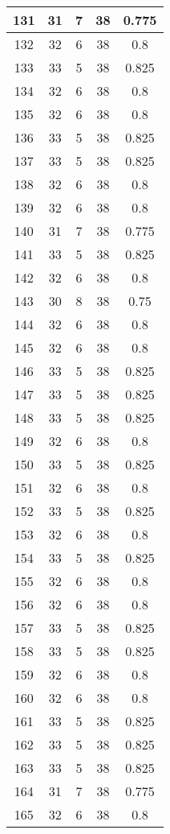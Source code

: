 \documentclass[letterpaper, 12pt]{article}
\begin{document}
\begin{longtable}{|c|c|c|c|c|}
\hline
131 & 31 & 7 & 38 & 0.775 \\
\hline
132 & 32 & 6 & 38 & 0.8 \\
\hline
133 & 33 & 5 & 38 & 0.825 \\
\hline
134 & 32 & 6 & 38 & 0.8 \\
\hline
135 & 32 & 6 & 38 & 0.8 \\
\hline
136 & 33 & 5 & 38 & 0.825 \\
\hline
137 & 33 & 5 & 38 & 0.825 \\
\hline
138 & 32 & 6 & 38 & 0.8 \\
\hline
139 & 32 & 6 & 38 & 0.8 \\
\hline
140 & 31 & 7 & 38 & 0.775 \\
\hline
141 & 33 & 5 & 38 & 0.825 \\
\hline
142 & 32 & 6 & 38 & 0.8 \\
\hline
143 & 30 & 8 & 38 & 0.75 \\
\hline
144 & 32 & 6 & 38 & 0.8 \\
\hline
145 & 32 & 6 & 38 & 0.8 \\
\hline
146 & 33 & 5 & 38 & 0.825 \\
\hline
147 & 33 & 5 & 38 & 0.825 \\
\hline
148 & 33 & 5 & 38 & 0.825 \\
\hline
149 & 32 & 6 & 38 & 0.8 \\
\hline
150 & 33 & 5 & 38 & 0.825 \\
\hline
151 & 32 & 6 & 38 & 0.8 \\
\hline
152 & 33 & 5 & 38 & 0.825 \\
\hline
153 & 32 & 6 & 38 & 0.8 \\
\hline
154 & 33 & 5 & 38 & 0.825 \\
\hline
155 & 32 & 6 & 38 & 0.8 \\
\hline
156 & 32 & 6 & 38 & 0.8 \\
\hline
157 & 33 & 5 & 38 & 0.825 \\
\hline
158 & 33 & 5 & 38 & 0.825 \\
\hline
159 & 32 & 6 & 38 & 0.8 \\
\hline
160 & 32 & 6 & 38 & 0.8 \\
\hline
161 & 33 & 5 & 38 & 0.825 \\
\hline
162 & 33 & 5 & 38 & 0.825 \\
\hline
163 & 33 & 5 & 38 & 0.825 \\
\hline
164 & 31 & 7 & 38 & 0.775 \\
\hline
165 & 32 & 6 & 38 & 0.8 \\

\end{longtable}
\end{document}
